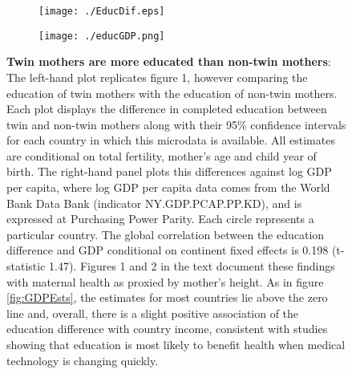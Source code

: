 \documentclass{nature}
\begin{document}
\begin{linenumbers}
\begin{spacing}{1}
  
\begin{figure}[htpb!]
\begin{subfigure}{.5\textwidth}
  \texttt{[image: ./EducDif.eps]}
\end{subfigure}%
\begin{subfigure}{.5\textwidth}
  \texttt{[image: ./educGDP.png]}
\end{subfigure}%
\vspace{5mm}
\caption{\textbf{Twin mothers are more educated than non-twin mothers}: {\footnotesize The left-hand plot replicates figure 1, however comparing the education of twin mothers with the education of non-twin mothers.  Each plot displays the difference in completed education between twin and non-twin mothers along with their 95\% confidence intervals for each country in which this microdata is available.  All estimates are conditional on total fertility, mother's age and child year of birth.  The right-hand panel plots this differences against log GDP per capita, where log GDP per capita data comes from the World Bank Data Bank (indicator NY.GDP.PCAP.PP.KD), and is expressed at Purchasing Power Parity.  Each circle represents a particular country. The global correlation between the education difference and GDP conditional on continent fixed effects is 0.198 (t-statistic 1.47). Figures 1 and 2 in the text document these findings with maternal health as proxied by mother's height. As in figure \ref{fig:GDPEsts}, the estimates for most countries lie above the zero line and, overall, there is a slight positive association of the education difference with country income, consistent with studies showing that education is most likely to benefit health when medical technology is changing quickly\cite{LlerasMuneyGlied2008}.}}
\label{fig:educAll}
\end{figure}


\end{spacing}
\end{linenumbers}
\end{document}
